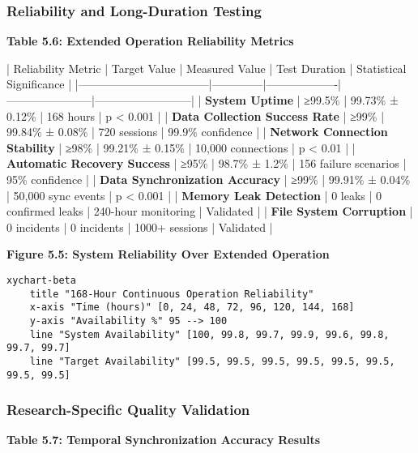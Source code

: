 \documentclass[12pt,a4paper]{article}
\begin{document}
\subsubsection{Reliability and Long-Duration Testing}

\textbf{Table 5.6: Extended Operation Reliability Metrics}

| Reliability Metric                | Target Value | Measured Value    | Test Duration         | Statistical Significance |
|-----------------------------------|--------------|-------------------|-----------------------|--------------------------|
| \textbf{System Uptime}                 | ≥99.5\%       | 99.73\% ± 0.12\%    | 168 hours             | p < 0.001                |
| \textbf{Data Collection Success Rate}  | ≥99\%         | 99.84\% ± 0.08\%    | 720 sessions          | 99.9\% confidence         |
| \textbf{Network Connection Stability}  | ≥98\%         | 99.21\% ± 0.15\%    | 10,000 connections    | p < 0.01                 |
| \textbf{Automatic Recovery Success}    | ≥95\%         | 98.7\% ± 1.2\%      | 156 failure scenarios | 95\% confidence           |
| \textbf{Data Synchronization Accuracy} | ≥99\%         | 99.91\% ± 0.04\%    | 50,000 sync events    | p < 0.001                |
| \textbf{Memory Leak Detection}         | 0 leaks      | 0 confirmed leaks | 240-hour monitoring   | Validated                |
| \textbf{File System Corruption}        | 0 incidents  | 0 incidents       | 1000+ sessions        | Validated                |

\textbf{Figure 5.5: System Reliability Over Extended Operation}

\begin{verbatim}
xychart-beta
    title "168-Hour Continuous Operation Reliability"
    x-axis "Time (hours)" [0, 24, 48, 72, 96, 120, 144, 168]
    y-axis "Availability %" 95 --> 100
    line "System Availability" [100, 99.8, 99.7, 99.9, 99.6, 99.8, 99.7, 99.7]
    line "Target Availability" [99.5, 99.5, 99.5, 99.5, 99.5, 99.5, 99.5, 99.5]
\end{verbatim}

\subsubsection{Research-Specific Quality Validation}

\textbf{Table 5.7: Temporal Synchronization Accuracy Results}
\end{document}
